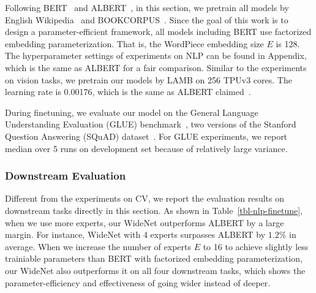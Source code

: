 \documentclass[letterpaper]{article} %
\def\revise{\textcolor{red}}
\begin{document}
Following BERT~\citep{devlin-etal-2019-bert} and ALBERT~\citep{lan2019albert}, in this section, we pretrain all models by English Wikipedia~\citep{devlin-etal-2019-bert} and BOOKCORPUS~\citep{zhu2015aligning}. Since the goal of this work is to design a parameter-efficient framework, all models including BERT use factorized embedding parameterization. That is, the WordPiece embedding size $E$ is 128. The hyperparameter settings of experiments on NLP can be found in Appendix, which is the same as ALBERT for a fair comparison. Similar to the experiments on vision tasks, we pretrain our models by LAMB on 256 TPUv3 cores. The learning rate is 0.00176, which is the same as ALBERT claimed~\citep{you2019reducing}.

During finetuning, we evaluate our model on the General Language Understanding Evaluation (GLUE) benchmark~\citep{wang-etal-2018-glue}, two versions of the Stanford Question Answering (SQuAD) dataset~\citep{rajpurkar-etal-2016-squad,rajpurkar-etal-2018-know}. For GLUE experiments, we report median over 5 runs on development set because of relatively large variance.

\subsubsection{Downstream Evaluation}
\label{sec:nlp-downsteam}






Different from the experiments on CV, we report the evaluation results on downstream tasks directly in this section. As shown in Table~\ref{tbl-nlp-finetune}, when we use more experts, our WideNet outperforms ALBERT by a large margin. For instance, WideNet with 4 experts surpasses ALBERT by $1.2\%$ in average. When we increase the number of experts $E$ to 16 to achieve slightly less trainiable parameters than BERT with factorized embedding  parameterization, our WideNet also outperforms it on all four downstream tasks, which shows the parameter-efficiency and effectiveness of going wider instead of deeper.

\end{document}
